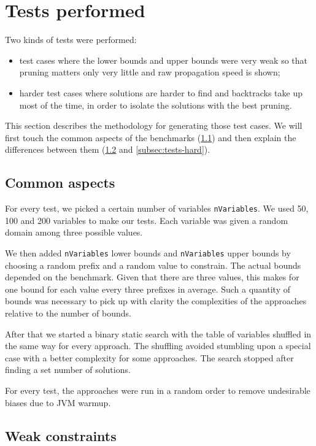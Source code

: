 \documentclass[a4paper,10pt]{article}
\begin{document}
\section{Tests performed}

Two kinds of tests were performed:
\begin{itemize}
    \item test cases where the lower bounds and upper bounds were very weak so that pruning matters only very little and raw propagation speed is shown;
    \item harder test cases where solutions are harder to find and backtracks take up most of the time, in order to isolate the solutions with the best pruning.
\end{itemize}

This section describes the methodology for generating those test cases. We will first touch the common aspects of the benchmarks (\ref{subsec:tests-common}) and then explain the differences between them (\ref{subsec:tests-weak} and \ref{subsec:tests-hard}).

\subsection{Common aspects}
\label{subsec:tests-common}
For every test, we picked a certain number of variables \texttt{nVariables}. We used 50, 100 and 200 variables to make our tests. Each variable was given a random domain among three possible values.

We then added \texttt{nVariables} lower bounds and \texttt{nVariables} upper bounds by choosing a random prefix and a random value to constrain. The actual bounds depended on the benchmark. Given that there are three values, this makes for one bound for each value every three prefixes in average. Such a quantity of bounds was necessary to pick up with clarity the complexities of the approaches relative to the number of bounds.

After that we started a binary static search with the table of variables shuffled in the same way for every approach. The shuffling avoided stumbling upon a special case with a better complexity for some approaches. The search stopped after finding a set number of solutions.

For every test, the approaches were run in a random order to remove undesirable biases due to JVM warmup.

\subsection{Weak constraints}
\label{subsec:tests-weak}
\end{document}
